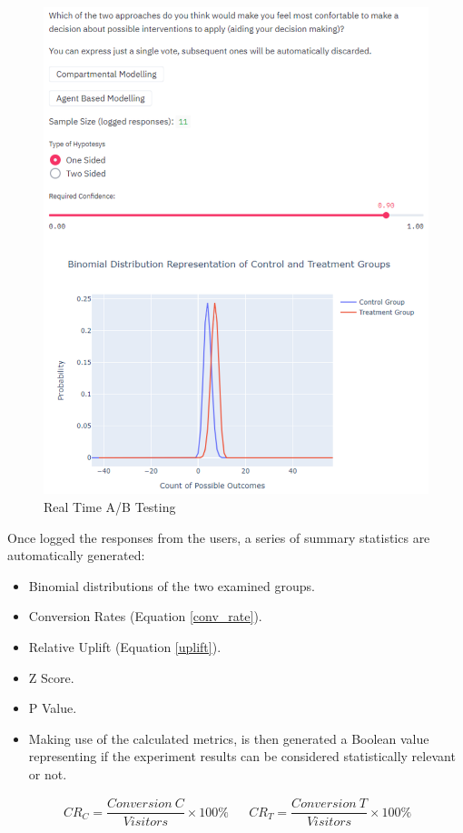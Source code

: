 \begin{figure}[ht!]%
    \centering
    \includegraphics[width=0.85\linewidth]{latex/images/ab_live.pdf}
    \caption{Real Time A/B Testing}
    \label{liveab}
\end{figure}
\vspace{-0.2cm}
Once logged the responses from the users, a series of summary statistics are automatically generated:
\vspace{-0.4cm}
\begin{itemize}
    \setlength\itemsep{-0.3cm}
    \item Binomial distributions of the two examined groups.
    \item Conversion Rates (Equation \ref{conv_rate}).
    \item Relative Uplift (Equation \ref{uplift}).
    \item Z Score.
    \item P Value. 
    \item Making use of the calculated metrics, is then generated a Boolean value representing if the experiment results can be considered statistically relevant or not.
\end{itemize}

\useshortskip
\begin{align}
\ CR_{C} = \dfrac{Conversion\:C}{Visitors}\times100\% && CR_{T} = \dfrac{Conversion\:T}{Visitors}\times100\%
\label{conv_rate}
\end{align}
\useshortskip

